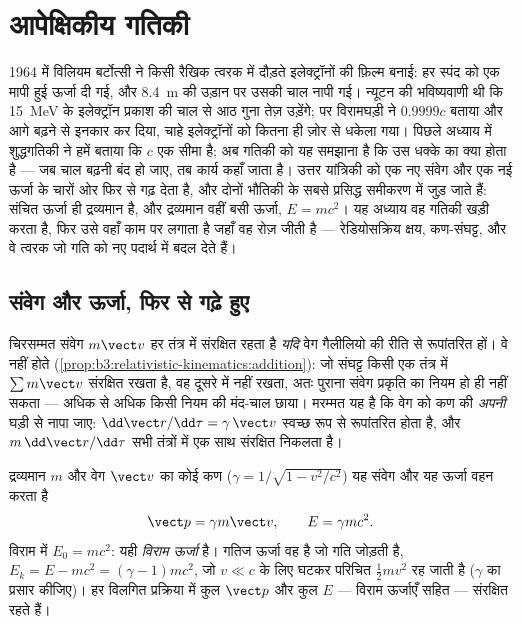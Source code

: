 \chapter{आपेक्षिकीय गतिकी}\label{ch:b3:relativistic-dynamics}

1964 में विलियम बर्टोत्सी ने किसी रैखिक त्वरक में दौड़ते इलेक्ट्रॉनों की
फ़िल्म बनाई: हर स्पंद को एक मापी हुई ऊर्जा दी गई, और \qty{8.4}{m} की
उड़ान पर उसकी चाल नापी गई। न्यूटन की भविष्यवाणी थी कि
\qty{15}{MeV} के इलेक्ट्रॉन प्रकाश की चाल से आठ गुना तेज़ उड़ेंगे;
पर विरामघड़ी ने $0.9999c$ बताया और आगे बढ़ने से इनकार कर दिया, चाहे
इलेक्ट्रॉनों को कितना ही ज़ोर से धकेला गया। पिछले अध्याय में शुद्धगतिकी
ने हमें बताया कि $c$ एक सीमा है; अब गतिकी को यह समझाना है कि उस धक्के का
क्या होता है --- जब चाल बढ़नी बंद हो जाए, तब कार्य कहाँ जाता है। उत्तर
यांत्रिकी को एक नए संवेग और एक नई ऊर्जा के चारों ओर फिर से गढ़ देता है,
और दोनों भौतिकी के सबसे प्रसिद्ध समीकरण में जुड़ जाते हैं: संचित ऊर्जा
ही द्रव्यमान है, और द्रव्यमान वहीं बसी ऊर्जा,
$E = mc^2$। यह अध्याय वह गतिकी खड़ी करता है, फिर उसे वहाँ काम पर लगाता
है जहाँ वह रोज़ जीती है --- रेडियोसक्रिय क्षय, कण-संघट्ट, और वे त्वरक
जो गति को नए पदार्थ में बदल देते हैं।

\section{संवेग और ऊर्जा, फिर से गढ़े हुए}

\begin{remark}[$m\vect v$ को क्यों जाना पड़ा]\label{rem:b3:relativistic-dynamics:why}
चिरसम्मत संवेग $m\vect v$ हर तंत्र में संरक्षित रहता है \emph{यदि}
वेग गैलीलियो की रीति से रूपांतरित हों। वे नहीं होते
(\cref{prop:b3:relativistic-kinematics:addition}): जो संघट्ट किसी एक
तंत्र में $\sum m\vect v$ संरक्षित रखता है, वह दूसरे में नहीं रखता, अतः
पुराना संवेग प्रकृति का नियम हो ही नहीं सकता --- अधिक से अधिक किसी नियम
की मंद-चाल छाया। मरम्मत यह है कि वेग को कण की \emph{अपनी} घड़ी से नापा
जाए: $\dd\vect r/\dd\tau =
\gamma\,\vect v$ स्वच्छ रूप से रूपांतरित होता है, और $m\,\dd\vect r/\dd\tau$ सभी तंत्रों में एक साथ संरक्षित
निकलता है।
\end{remark}

\begin{definition}[आपेक्षिकीय संवेग और ऊर्जा]\label{def:b3:relativistic-dynamics:momentum-energy}
द्रव्यमान $m$ और वेग $\vect v$ का कोई कण ($\gamma = 1/\sqrt{1 -
v^2/c^2}$) यह संवेग और यह ऊर्जा वहन करता है
\[
\vect p = \gamma m\vect v , \qquad
E = \gamma mc^2 .
\]
विराम में $E_0 = mc^2$: यही \emph{विराम ऊर्जा} है। गतिज ऊर्जा वह है जो
गति जोड़ती है, $E_k = E - mc^2 = (\gamma - 1)mc^2$, जो $v
\ll c$ के लिए घटकर परिचित $\tfrac12 mv^2$ रह जाती है ($\gamma$ का
प्रसार कीजिए)। हर विलगित प्रक्रिया में कुल $\vect p$ और कुल $E$ ---
विराम ऊर्जाएँ सहित --- संरक्षित रहते हैं।
\end{definition}

